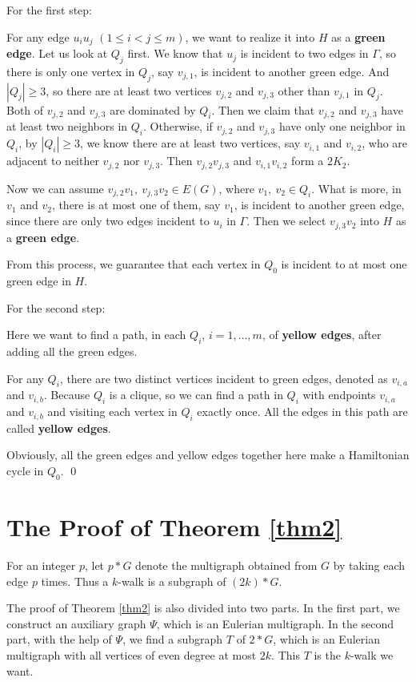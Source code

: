\documentclass{amsart}
\theoremstyle{definition}
\begin{document}
For the first step:

For any edge $u_iu_j$ $(1\le i<j\le m)$, we want to realize it into $H$ as a {\bf green edge}. Let us look at $Q_j$ first. We know that $u_j$ is incident to two edges in $\Gamma$, so there is only one vertex in $Q_j$, say $v_{j,1}$, is incident to another green edge. And $|Q_j|\ge3$, so there are at least two vertices $v_{j,2}$ and $v_{j,3}$ other than $v_{j,1}$ in $Q_j$. Both of $v_{j,2}$ and $v_{j,3}$ are dominated by $Q_i$. Then we claim that $v_{j,2}$ and $v_{j,3}$ have at least two neighbors in $Q_i$. Otherwise, if $v_{j,2}$ and $v_{j,3}$ have only one neighbor in $Q_i$, by $|Q_i|\ge3$, we know there are at least two vertices, say $v_{i,1}$ and $v_{i,2}$, who are adjacent to neither $v_{j,2}$ nor $v_{j,3}$. Then $v_{j,2}v_{j,3}$ and $v_{i,1}v_{i,2}$ form a $2K_2$.

Now we can assume $v_{j,2}v_1,~v_{j,3}v_2\in E(G)$, where $v_1,~v_2\in Q_i$. What is more, in $v_1$ and $v_2$, there is at most one of them, say $v_1$, is incident to another green edge, since there are only two edges incident to $u_i$ in $\Gamma$. Then we select $v_{j,3}v_2$ into $H$ as a {\bf green edge}.

From this process, we guarantee that each vertex in $Q_0$ is incident to at most one green edge in $H$.

For the second step:

Here we want to find a path, in each $Q_i$, $i=1,\dots,m$, of {\bf yellow edges}, after adding all the green edges.

For any $Q_i$, there are two distinct vertices incident to green edges, denoted as $v_{i,a}$ and $v_{i,b}$. Because $Q_i$ is a clique, so we can find a path in $Q_i$ with endpoints $v_{i,a}$ and $v_{i,b}$ and visiting each vertex in $Q_i$ exactly once. All the edges in this path are called {\bf yellow edges}.

Obviously, all the green edges and yellow edges together here make a Hamiltonian cycle in $Q_0$.  \qed

\section{The Proof of Theorem \ref{thm2}}

For an integer $p$, let $p*G$ denote the multigraph obtained from $G$ by taking each edge $p$ times. 
Thus a $k$-walk is a subgraph of $(2k)*G$. 

The proof of Theorem \ref{thm2} is also divided into two parts. In the first
part, we construct an auxiliary graph $\Psi$, which is an Eulerian multigraph.
In the second part, with the help of $\Psi$, we find a subgraph $T$ of $2*G$,
which is an Eulerian multigraph with all vertices of even degree at
most $2k$. This $T$ is the $k$-walk we want.
\end{document}
